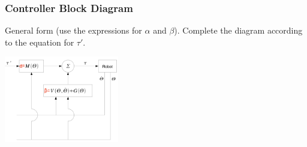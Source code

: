 \subsubsection{Controller Block Diagram}

\begin{center}
	\begin{minipage}[c]{0.4\textwidth}
	General form (use the expressions for $\alpha$ and $\beta$). Complete the diagram according to the equation for $\tau'$.
	\end{minipage}
	\hfill
	\begin{minipage}[c]{0.55\textwidth}
	\includegraphics[width=5cm]{sections/imgs/8_controller_block_diagram.png}
	\end{minipage}
\end{center}





